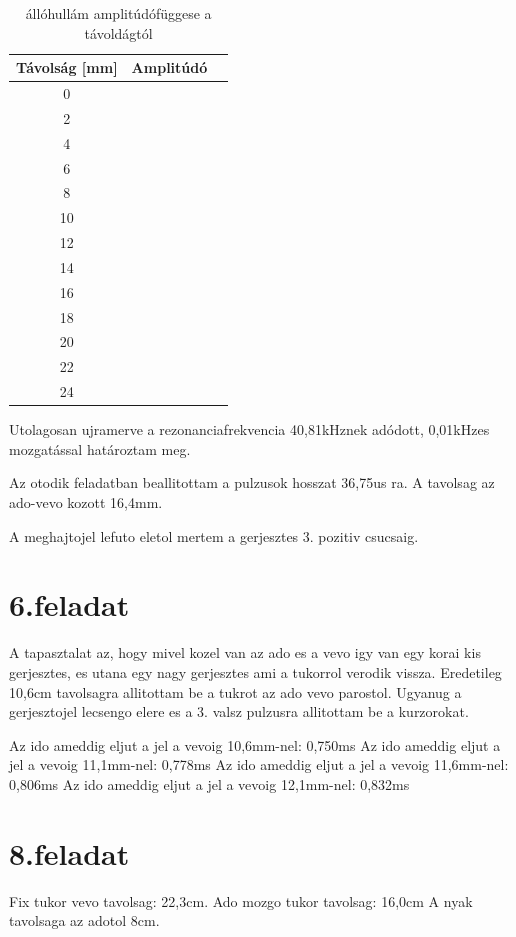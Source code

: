 \documentclass{article}
\begin{document}
\begin{table}[h!]
    \centering
    \begin{tabular}{|c|c|c|}
        \hline
        Távolság [mm] & Amplitúdó \\ \hline
        0 &  \\ \hline
        2 &  \\ \hline
        4 &  \\ \hline
        6 &  \\ \hline
        8 &  \\ \hline
        10 &  \\ \hline
        12 &  \\ \hline
        14 &  \\ \hline
        16 &  \\ \hline
        18 &  \\ \hline
        20 &  \\ \hline
        22 &  \\ \hline
        24 &  \\ \hline
    \end{tabular}
    \caption{állóhullám amplitúdófüggese a távoldágtól}
    \label{állóhullám}
\end{table}


Utolagosan ujramerve a rezonanciafrekvencia 40,81kHznek adódott, 0,01kHzes mozgatással határoztam meg.

Az otodik feladatban beallitottam a pulzusok hosszat 36,75us ra. A tavolsag az ado-vevo kozott 16,4mm.

A meghajtojel lefuto eletol mertem a gerjesztes 3. pozitiv csucsaig.

\section{6.feladat}

A tapasztalat az, hogy mivel kozel van az ado es a vevo igy van egy korai kis gerjesztes, es utana egy nagy gerjesztes ami a tukorrol verodik vissza. Eredetileg 10,6cm tavolsagra allitottam be a tukrot az ado vevo parostol. Ugyanug a gerjesztojel lecsengo elere es a 3. valsz pulzusra allitottam be a kurzorokat.

Az ido ameddig eljut a jel a vevoig 10,6mm-nel: 0,750ms
Az ido ameddig eljut a jel a vevoig 11,1mm-nel: 0,778ms
Az ido ameddig eljut a jel a vevoig 11,6mm-nel: 0,806ms
Az ido ameddig eljut a jel a vevoig 12,1mm-nel: 0,832ms


\section{8.feladat}

Fix tukor vevo tavolsag: 22,3cm. Ado mozgo tukor tavolsag: 16,0cm A nyak tavolsaga az adotol 8cm.
\end{document}
